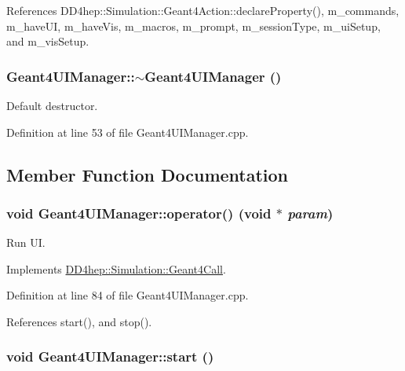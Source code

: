 References DD4hep::Simulation::Geant4Action::declareProperty(), m\_\-commands, m\_\-haveUI, m\_\-haveVis, m\_\-macros, m\_\-prompt, m\_\-sessionType, m\_\-uiSetup, and m\_\-visSetup.\hypertarget{class_d_d4hep_1_1_simulation_1_1_geant4_u_i_manager_af668d960c771504a66490bdf8f0aebd8}{
\subsubsection[{$\sim$Geant4UIManager}]{\setlength{\rightskip}{0pt plus 5cm}Geant4UIManager::$\sim$Geant4UIManager ()}}
\label{class_d_d4hep_1_1_simulation_1_1_geant4_u_i_manager_af668d960c771504a66490bdf8f0aebd8}


Default destructor. 

Definition at line 53 of file Geant4UIManager.cpp.

\subsection{Member Function Documentation}
\hypertarget{class_d_d4hep_1_1_simulation_1_1_geant4_u_i_manager_a3b883391f9b66b1620c0ba44406b3247}{
\subsubsection[{operator()}]{\setlength{\rightskip}{0pt plus 5cm}void Geant4UIManager::operator() (void $\ast$ {\em param})}}
\label{class_d_d4hep_1_1_simulation_1_1_geant4_u_i_manager_a3b883391f9b66b1620c0ba44406b3247}


Run UI. 

Implements \hyperlink{class_d_d4hep_1_1_simulation_1_1_geant4_call_ab55505a1c9fb5e928c995d1312d4158e}{DD4hep::Simulation::Geant4Call}.

Definition at line 84 of file Geant4UIManager.cpp.

References start(), and stop().\hypertarget{class_d_d4hep_1_1_simulation_1_1_geant4_u_i_manager_af092b336d49fbb7cf68f41b60b4dc88d}{
\subsubsection[{start}]{\setlength{\rightskip}{0pt plus 5cm}void Geant4UIManager::start ()}}
\label{class_d_d4hep_1_1_simulation_1_1_geant4_u_i_manager_af092b336d49fbb7cf68f41b60b4dc88d}


